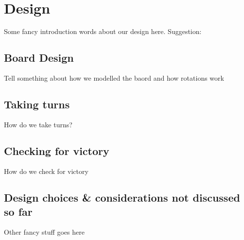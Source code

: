 \section{Design}
\label{Design}
Some fancy introduction words about our design here.
Suggestion:
\subsection{Board Design}
Tell something about how we modelled the baord and how rotations work
\subsection{Taking turns}
How do we take turns?
\subsection{Checking for victory}
How do we check for victory
\subsection{Design choices \& considerations not discussed so far}
Other fancy stuff goes here